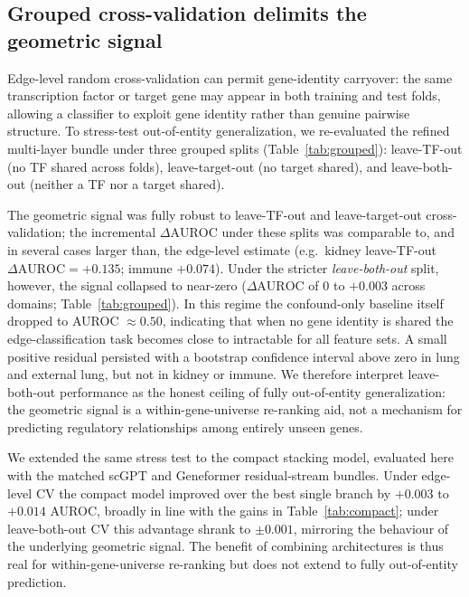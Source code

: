 \documentclass[11pt]{article}
\newcommand{\DAURC}{\Delta\mathrm{AUROC}}
\begin{document}
\subsection*{Grouped cross-validation delimits the geometric signal}

Edge-level random cross-validation can permit gene-identity carryover: the same transcription factor or target gene may appear in both training and test folds, allowing a classifier to exploit gene identity rather than genuine pairwise structure.
To stress-test out-of-entity generalization, we re-evaluated the refined multi-layer bundle under three grouped splits (Table~\ref{tab:grouped}): leave-TF-out (no TF shared across folds), leave-target-out (no target shared), and leave-both-out (neither a TF nor a target shared).

The geometric signal was fully robust to leave-TF-out and leave-target-out cross-validation; the incremental $\DAURC$ under these splits was comparable to, and in several cases larger than, the edge-level estimate (e.g.\ kidney leave-TF-out $\DAURC = +0.135$; immune $+0.074$).
Under the stricter \emph{leave-both-out} split, however, the signal collapsed to near-zero ($\DAURC$ of $0$ to $+0.003$ across domains; Table~\ref{tab:grouped}).
In this regime the confound-only baseline itself dropped to AUROC $\approx 0.50$, indicating that when no gene identity is shared the edge-classification task becomes close to intractable for all feature sets.
A small positive residual persisted with a bootstrap confidence interval above zero in lung and external lung, but not in kidney or immune.
We therefore interpret leave-both-out performance as the honest ceiling of fully out-of-entity generalization: the geometric signal is a within-gene-universe re-ranking aid, not a mechanism for predicting regulatory relationships among entirely unseen genes.

We extended the same stress test to the compact stacking model, evaluated here with the matched scGPT and Geneformer residual-stream bundles.
Under edge-level CV the compact model improved over the best single branch by $+0.003$ to $+0.014$ AUROC, broadly in line with the gains in Table~\ref{tab:compact}; under leave-both-out CV this advantage shrank to $\pm0.001$, mirroring the behaviour of the underlying geometric signal.
The benefit of combining architectures is thus real for within-gene-universe re-ranking but does not extend to fully out-of-entity prediction.
\end{document}
